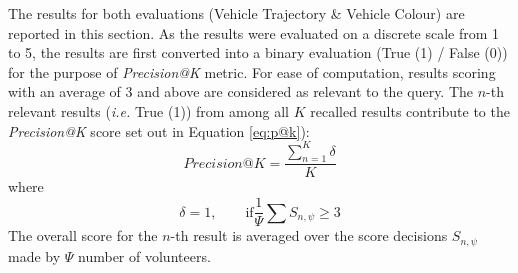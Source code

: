 The results for both evaluations (Vehicle Trajectory \& Vehicle Colour) are reported in this section. As the results were evaluated on a discrete scale from 1 to 5, the results are first converted into a binary evaluation (True (1) /
False (0)) for the purpose of \textit{Precision@K} metric. For ease of computation, results scoring with an average of 3 and above are considered as relevant to the query. The $n$-th relevant results (\emph{i.e.} True (1)) from among all $K$ recalled results contribute to the
\textit{Precision@K} score set out in Equation \ref{eq:p@k}):
\begin{equation}
\label{eq:p@k}
Precision@K =  \frac{\sum_{n=1}^K \delta}{K}
\end{equation}
where 
\begin{equation}
\delta=1, \qquad \text{if} \frac{1}{\Psi}\sum S_{n,\psi} \geq 3
\end{equation}
The overall score for the $n$-th result is averaged over the score decisions $S_{n,\psi}$ made by $\Psi$ number of volunteers.

\vspace{1em}
